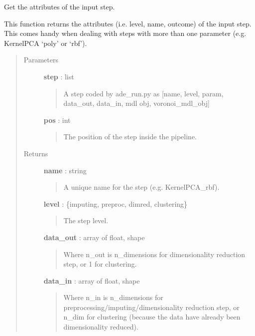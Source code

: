 \documentclass[letterpaper,10pt,english]{sphinxmanual}
\begin{document}
\begin{fulllineitems}
\label{index:adenine.core.analyze_results.get_step_attributes}
Get the attributes of the input step.

This function returns the attributes (i.e. level, name, outcome) of the
input step. This comes handy when dealing with steps with more than one
parameter (e.g. KernelPCA `poly' or `rbf').
\begin{quote}\begin{description}
\item[{Parameters}] \leavevmode
\textbf{step} : list
\begin{quote}

A step coded by ade\_run.py as
{[}name, level, param, data\_out, data\_in, mdl obj, voronoi\_mdl\_obj{]}
\end{quote}

\textbf{pos} : int
\begin{quote}

The position of the step inside the pipeline.
\end{quote}

\item[{Returns}] \leavevmode
\textbf{name} : string
\begin{quote}

A unique name for the step (e.g. KernelPCA\_rbf).
\end{quote}

\textbf{level} : \{imputing, preproc, dimred, clustering\}
\begin{quote}

The step level.
\end{quote}

\textbf{data\_out} : array of float, shape
\begin{quote}

Where n\_out is n\_dimensions for dimensionality reduction step, or 1
for clustering.
\end{quote}

\textbf{data\_in} : array of float, shape
\begin{quote}

Where n\_in is n\_dimensions for preprocessing/imputing/dimensionality
reduction step, or n\_dim for clustering (because the data have already
been dimensionality reduced).
\end{quote}


\end{description}
\end{quote}
\end{fulllineitems}
\end{document}
